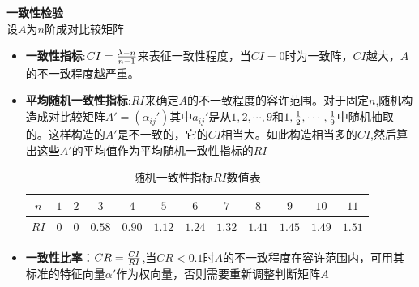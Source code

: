 \documentclass[openany]{progbookcn}
\begin{document}
\noindent \textbf{一致性检验}\\
设$A$为$n$阶成对比较矩阵
\begin{itemize}
\item {\bf 一致性指标}:$CI={{\lambda-n}\over{n-1}}$来表征一致性程度，当$CI=0$时为一致阵，$CI$越大，$A$的不一致程度越严重。
\item {\bf 平均随机一致性指标}:$RI$来确定$A$的不一致程度的容许范围。对于固定$n$,随机构造成对比较矩阵$A'=(\alpha_{ij}')$其中$a_{ij}'$是从$1,2,\cdots,9$和$1,{1\over 2},\cdots,{1\over 9}$中随机抽取的。这样构造的$A'$是不一致的，它的$CI$相当大。如此构造相当多的$CI$,然后算出这些$A'$的平均值作为平均随机一致性指标的$RI$
\begin{table}[h]
\centering
\caption{随机一致性指标$RI$数值表}
\begin{tabular}{|c|ccccccccccc|}
\hline
{$n$} & $1$ & $2$ & $3$ & $4$ & $5$ & $6$ & $7$ & $8$ & $9$ & $10$ &$11$\\
\hline
{$RI$} & $0$& $0$& $0.58$& $0.90$& $1.12$& $1.24$& $1.32$& $1.41$& $1.45$& $1.49$& $1.51$\\
\hline
\end{tabular}
\end{table}
\item {\bf 一致性比率}：$CR={{CI}\over {RI}}$,当$CR<0.1$时$A$的不一致程度在容许范围内，可用其标准的特征向量$\alpha'$作为权向量，否则需要重新调整判断矩阵$A$
\end{itemize}
\end{document}
